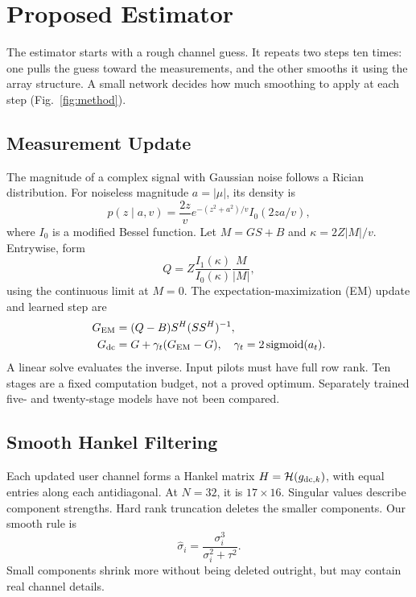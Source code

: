 \documentclass[journal]{IEEEtran}
\newcommand{\Hank}{\mathcal{H}}
\DeclareMathOperator{\sigmoid}{sigmoid}
\begin{document}
\section{Proposed Estimator}
The estimator starts with a rough channel guess. It repeats two steps ten
times: one pulls the guess toward the measurements, and the other smooths
it using the array structure. A small network decides how much smoothing
to apply at each step (Fig.~\ref{fig:method}).

\subsection{Measurement Update}
The magnitude of a complex signal with Gaussian noise follows a Rician
distribution. For noiseless magnitude $a=|\mu|$, its density is
\begin{equation}
 p(z\mid a,v)=\frac{2z}{v}e^{-(z^2+a^2)/v}I_0(2za/v),
\end{equation}
where $I_0$ is a modified Bessel function. Let $M=GS+B$ and
$\kappa=2Z|M|/v$. Entrywise, form
\begin{equation}
 Q=Z\frac{I_1(\kappa)}{I_0(\kappa)}\frac{M}{|M|},
\end{equation}
using the continuous limit at $M=0$. The expectation-maximization (EM)
update and learned step are
\begin{align}
 G_{\rm EM}&=(Q-B)S^H(SS^H)^{-1},\\
 G_{\rm dc}&=G+\gamma_t(G_{\rm EM}-G),\quad
 \gamma_t=2\sigmoid(a_t).
\end{align}
A linear solve evaluates the inverse. Input pilots must have full row
rank. Ten stages are a fixed computation budget, not a proved optimum.
Separately trained five- and twenty-stage models have not been compared.

\subsection{Smooth Hankel Filtering}
Each updated user channel forms a Hankel matrix $H=\Hank(g_{{\rm dc},k})$,
with equal entries along each antidiagonal. At $N=32$, it is $17\times16$.
Singular values describe component strengths. Hard rank truncation deletes
the smaller components. Our smooth rule is
\begin{equation}
 \widehat\sigma_i=\frac{\sigma_i^3}{\sigma_i^2+\tau^2}.
\end{equation}
Small components shrink more without being deleted outright, but may
contain real channel details.
\end{document}
